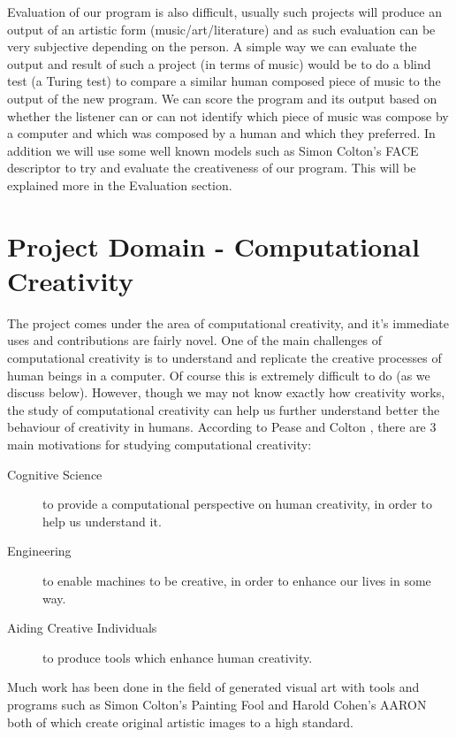 \documentclass[pdftex,12pt,a4paper]{report}
\begin{document}
Evaluation of our program is also difficult, usually such projects will produce an output of an artistic form (music/art/literature) and as such evaluation can be very subjective depending on the person. A simple way we can evaluate the output and result of such a project (in terms of music) would be to do a blind test (a Turing test) to compare a similar human composed piece of music to the output of the new program. We can score the program and its output based on whether the listener can or can not identify which piece of music was compose by a computer and which was composed by a human and which they preferred. In addition we will use some well known models such as Simon Colton's FACE descriptor \cite{coltonface2011} to try and evaluate the creativeness of our program. This will be explained more in the Evaluation section.


\section{Project Domain - Computational Creativity}
The project comes under the area of computational creativity, and it's immediate uses and contributions are fairly novel. One of the main challenges of computational creativity is to understand and replicate the creative processes of human beings in a computer. Of course this is extremely difficult to do (as we discuss below). However, though we may not know exactly how creativity works, the study of computational creativity can help us further understand better the behaviour of creativity in humans. According to Pease and Colton \cite{pease11}, there are 3 main motivations for studying computational creativity:

\begin{description}
  \item[Cognitive Science] to provide a computational perspective on human creativity, in order to help us understand it.
  \item[Engineering] to enable machines to be creative, in order to enhance our lives in some way.
  \item[Aiding Creative Individuals] to produce tools which enhance human creativity. 
\end{description}

Much work has been done in the field of generated visual art with tools and programs such as Simon Colton's Painting Fool \cite{website:paintingfool} and Harold Cohen's AARON \cite{website:aaron} both of which create original artistic images to a high standard.
\end{document}
